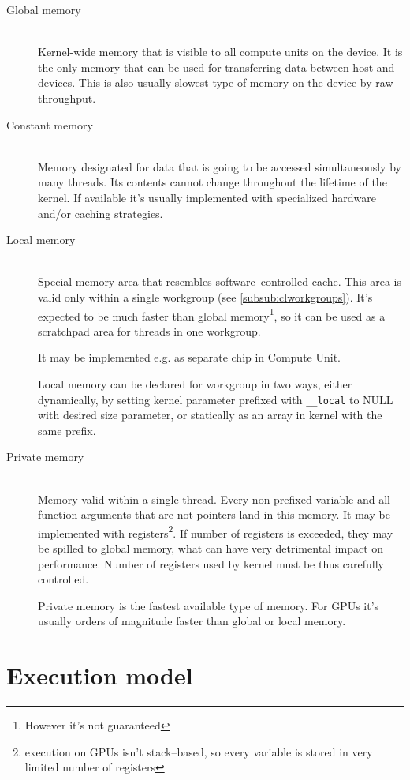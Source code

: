 \begin{description}
  \item[Global memory] \hfill \\
    Kernel-wide memory that is visible to all compute units on the device.
    It is the only memory that can be used for transferring data between host and
    devices. This is also usually slowest type of memory on the device by raw
    throughput.
  \item[Constant memory] \hfill \\
    Memory designated for data that is going to be accessed simultaneously by
    many threads. Its contents cannot change throughout the lifetime of the
    kernel. If available it's usually implemented with specialized hardware
    and/or caching strategies.
  \item[Local memory] \hfill \\
    Special memory area that resembles software--controlled cache. This area is
    valid only within a single workgroup (see \autoref{subsub:clworkgroups}). It's
    expected to be much faster than global memory\footnote{However it's not guaranteed},
    so it can be used as a scratchpad area for threads in one workgroup.

    It may be implemented e.g. as separate chip in Compute Unit.

    Local memory can be declared for workgroup in two ways, either dynamically,
    by setting kernel parameter prefixed with \texttt{\_\_local} to NULL with
    desired size parameter, or statically as an array in kernel with the same
    prefix.

  \item[Private memory] \hfill \\
    Memory valid within a single thread. Every non-prefixed variable and all function
    arguments that are not pointers land in this memory. It may be implemented
    with registers\footnote{execution on GPUs isn't stack--based, so every variable
    is stored in very limited number of registers}. If number of registers is
    exceeded, they may be spilled to global memory, what can have very
    detrimental impact on performance. Number of registers used by kernel must
    be thus carefully controlled.

    Private memory is the fastest available type of memory. For GPUs it's usually
    orders of magnitude faster than global or local memory.
\end{description}

\section{Execution model}
\label{sec:clexecmodel}

